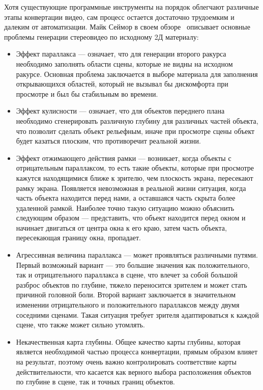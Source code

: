 \documentclass[14pt, a4paper]{extarticle}
\begin{document}
Хотя существующие программные инструменты на порядок облегчают различные 
этапы конвертации видео, сам процесс остается достаточно трудоемким и 
далеким от автоматизации. Майк Сеймор в своем обзоре~\cite{seymour2012art} 
описывает основные проблемы генерации стереовидео по исходному 2Д материалу:
\begin{itemize}
	\item Эффект параллакса --- означает, что для генерации второго ракурса 
	необходимо заполнять области сцены, которые не видны на исходном ракурсе. 
	Основная проблема заключается в выборе материала для заполнения открывающихся 
	областей, который не вызывал бы дискомфорта при просмотре и был бы стабильным во времени.
	\item Эффект кулисности --- означает, что для объектов переднего плана необходимо 
	сгенерировать различную глубину для различных частей объекта, что позволит сделать 
	объект рельефным, иначе при просмотре сцены объект будет казаться плоским, 
	что противоречит реальной жизни.
	\item Эффект отжимающего действия рамки --- возникает, когда объекты с отрицательным 
	параллаксом, то есть такие объекты, которые при просмотре кажутся находящимися ближе к зрителю, 
	чем плоскость экрана, пересекают рамку экрана. Появляется невозможная в реальной 
	жизни ситуация, когда часть объекта находится перед нами, а оставшаяся часть скрыта 
	более удаленной рамкой. Наиболее точно такую ситуацию можно объяснить следующим 
	образом --- представить, что объект находится перед окном и начинает двигаться 
	от центра окна к его краю, затем часть объекта, пересекающая границу окна, пропадает.
	\item Агрессивная величина параллакса --- может проявляться различными путями. 
	Первый возможный вариант --- это большие значения как положительного, так и 
	отрицательного параллакса в сцене, что влечет за собой большой разброс объектов 
	по глубине, тяжело переносится зрителем и может стать причиной головной боли. 
	Второй вариант заключается в значительном изменении отрицательного и положительного 
	параллаксов между двумя соседними сценами. Такая ситуация требует зрителя 
	адаптироваться к каждой сцене, что также может сильно утомлять.
	\item Некачественная карта глубины. Общее качество карты глубины, которая является 
	необходимой частью процесса конвертации, прямым образом влияет на результат, 
	поэтому очень важно контролировать соответствие карты действительности, 
	что касается как верного выбора расположения объектов по глубине в сцене, 
	так и точных границ объектов.
\end{itemize}
\end{document}
